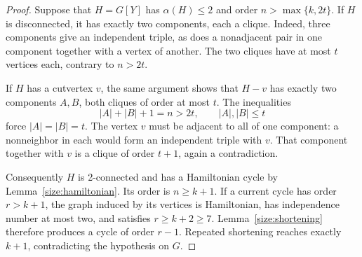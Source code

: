 \begin{proof}
Suppose that $H=G[Y]$ has $\alpha(H)\le2$ and order
$n>\max\{k,2t\}$.  If $H$ is disconnected, it has exactly two
components, each a clique.  Indeed, three components give an independent
triple, as does a nonadjacent pair in one component together with a vertex
of another.  The two cliques have at most $t$ vertices each, contrary to
$n>2t$.

If $H$ has a cutvertex $v$, the same argument shows that $H-v$ has
exactly two components $A,B$, both cliques of order at most $t$.
The inequalities
\[
 |A|+|B|+1=n>2t,\qquad |A|,|B|\le t
\]
force $|A|=|B|=t$.  The vertex $v$ must be adjacent to all of one
component: a nonneighbor in each would form an independent triple with
$v$.  That component together with $v$ is a clique of order $t+1$,
again a contradiction.

Consequently $H$ is 2-connected and has a Hamiltonian cycle by
Lemma~\ref{size:hamiltonian}.  Its order is $n\ge k+1$.  If a current
cycle has order $r>k+1$, the graph induced by its vertices is Hamiltonian,
has independence number at most two, and satisfies $r\ge k+2\ge7$.
Lemma~\ref{size:shortening} therefore produces a cycle of order $r-1$.
Repeated shortening reaches exactly $k+1$, contradicting the hypothesis
on $G$.
\end{proof}
